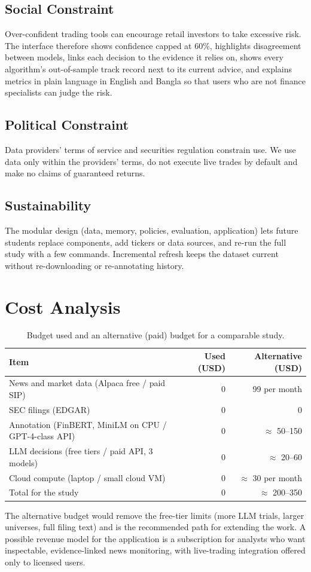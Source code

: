 \subsection{Social Constraint}
Over-confident trading tools can encourage retail investors to take excessive risk. The interface therefore shows confidence capped at 60\%, highlights disagreement between models, links each decision to the evidence it relies on, shows every algorithm's out-of-sample track record next to its current advice, and explains metrics in plain language in English and Bangla so that users who are not finance specialists can judge the risk.

\subsection{Political Constraint}
Data providers' terms of service and securities regulation constrain use. We use data only within the providers' terms, do not execute live trades by default and make no claims of guaranteed returns.

\subsection{Sustainability}
The modular design (data, memory, policies, evaluation, application) lets future students replace components, add tickers or data sources, and re-run the full study with a few commands. Incremental refresh keeps the dataset current without re-downloading or re-annotating history.

\section{Cost Analysis}
\begin{table}[H]
\centering
\caption{Budget used and an alternative (paid) budget for a comparable study.}
\label{tab:cost}
\begin{tabular}{lrr}
\hline
Item & Used (USD) & Alternative (USD) \\
\hline
News and market data (Alpaca free / paid SIP) & 0 & 99 per month \\
SEC filings (EDGAR) & 0 & 0 \\
Annotation (FinBERT, MiniLM on CPU / GPT-4-class API) & 0 & $\approx$ 50--150 \\
LLM decisions (free tiers / paid API, 3 models) & 0 & $\approx$ 20--60 \\
Cloud compute (laptop / small cloud VM) & 0 & $\approx$ 30 per month \\
\hline
Total for the study & 0 & $\approx$ 200--350 \\
\hline
\end{tabular}
\end{table}
The alternative budget would remove the free-tier limits (more LLM trials, larger universes, full filing text) and is the recommended path for extending the work. A possible revenue model for the application is a subscription for analysts who want inspectable, evidence-linked news monitoring, with live-trading integration offered only to licensed users.

